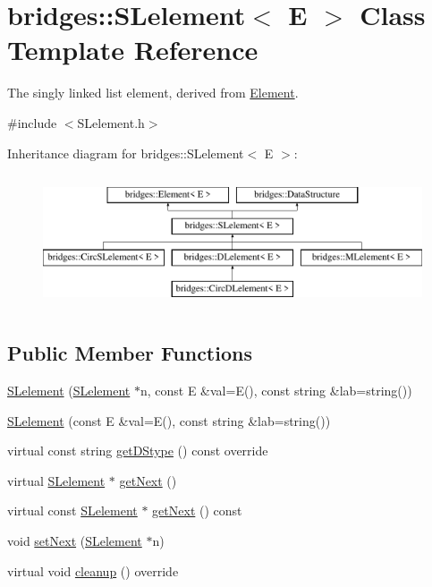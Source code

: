 \hypertarget{classbridges_1_1_s_lelement}{}\section{bridges\+:\+:S\+Lelement$<$ E $>$ Class Template Reference}
\label{classbridges_1_1_s_lelement}


The singly linked list element, derived from \mbox{\hyperlink{classbridges_1_1_element}{Element}}.  




{\ttfamily \#include $<$S\+Lelement.\+h$>$}

Inheritance diagram for bridges\+:\+:S\+Lelement$<$ E $>$\+:\begin{figure}[H]
\begin{center}
\leavevmode
\includegraphics[height=4.000000cm]{classbridges_1_1_s_lelement}
\end{center}
\end{figure}
\subsection*{Public Member Functions}
\begin{DoxyCompactItemize}
\item 
\mbox{\hyperlink{classbridges_1_1_s_lelement_a9ddac46a935b85cde76305135d16de0a}{S\+Lelement}} (\mbox{\hyperlink{classbridges_1_1_s_lelement}{S\+Lelement}} $\ast$n, const E \&val=E(), const string \&lab=string())
\item 
\mbox{\hyperlink{classbridges_1_1_s_lelement_a76423021747b1f2090847c418c13352b}{S\+Lelement}} (const E \&val=E(), const string \&lab=string())
\item 
virtual const string \mbox{\hyperlink{classbridges_1_1_s_lelement_a136330b3481a47b3edb429f323274655}{get\+D\+Stype}} () const override
\item 
virtual \mbox{\hyperlink{classbridges_1_1_s_lelement}{S\+Lelement}} $\ast$ \mbox{\hyperlink{classbridges_1_1_s_lelement_a5bd74108a9aa49339378bf62cdbb19ca}{get\+Next}} ()
\item 
virtual const \mbox{\hyperlink{classbridges_1_1_s_lelement}{S\+Lelement}} $\ast$ \mbox{\hyperlink{classbridges_1_1_s_lelement_a4422b7731a84734d312b8cd8e241b1e8}{get\+Next}} () const
\item 
void \mbox{\hyperlink{classbridges_1_1_s_lelement_a347f8809406f930ce83bf44764a4f1b5}{set\+Next}} (\mbox{\hyperlink{classbridges_1_1_s_lelement}{S\+Lelement}} $\ast$n)
\item 
virtual void \mbox{\hyperlink{classbridges_1_1_s_lelement_ac747648849874407e9d907bb4557dd52}{cleanup}} () override
\end{DoxyCompactItemize}
